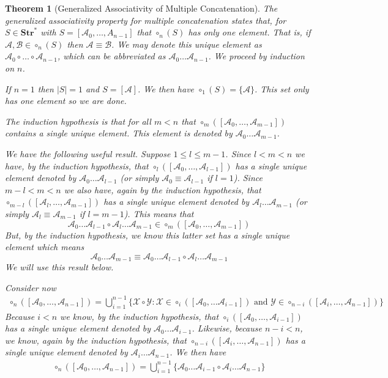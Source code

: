 \documentclass[12pt]{article}
\theoremstyle{break}
\theoremstyle{break}
\newtheorem{theorem}{Theorem}[section]
\theoremstyle{break}
\theoremstyle{break}
\newcommand{\mc}[1]{\mathcal{#1}}
\begin{document}
\begin{theorem}[Generalized Associativity of Multiple Concatenation]
The generalized associativity property for multiple concatenation states that, for $S\in\textbf{Str}^*$ with $S=[\mc{A}_0,\ldots,A_{n-1}]$ that $\circ_n(S)$ has only one element.
That is, if $\mc{A}, \mc{B}\in\circ_n(S)$ then $\mc{A}\equiv \mc{B}$.
We may denote this unique element as $\mc{A}_0\circ\ldots\circ\mc{A}_{n-1}$, which can be abbreviated as $\mc{A}_0\ldots\mc{A}_{n-1}$.
We proceed by induction on $n$.

If $n=1$ then $|S|=1$ and $S = [\mc{A}]$.
We then have $\circ_1(S) = \{\mc{A}\}$.
This set only has one element so we are done.

The induction hypothesis is that for all $m<n$ that $\circ_m([\mc{A}_0, \ldots, \mc{A}_{m-1}])$ contains a single unique element.
This element is denoted by $\mc{A}_0\ldots\mc{A}_{m-1}$.

We have the following useful result.
Suppose $1 \le l \le {m-1}$.
Since $l < m < n$ we have, by the induction hypothesis, that $\circ_l([\mc{A}_0, \ldots, \mc{A}_{l-1}])$ has a single unique element denoted by $\mc{A}_0\ldots\mc{A}_{l-1}$ (or simply $\mc{A}_0 \equiv \mc{A}_{l-1}$ if $l=1$).
Since $m-l < m < n$ we also have, again by the induction hypothesis, that $\circ_{m-l}([\mc{A}_l, \ldots, \mc{A}_{m-1}])$ has a single unique element denoted by $\mc{A}_l\ldots\mc{A}_{m-1}$ (or simply $\mc{A}_l \equiv \mc{A}_{m-1}$ if $l=m-1$).
This means that
$$
\mc{A}_0\ldots\mc{A}_{l-1} \circ \mc{A}_l\ldots\mc{A}_{m-1} \in \circ_m([\mc{A}_0, \ldots, \mc{A}_{m-1}])
$$
But, by the induction hypothesis, we know this latter set has a single unique element which means
$$
\mc{A}_0\ldots\mc{A}_{m-1} \equiv \mc{A}_0\ldots\mc{A}_{l-1}\circ \mc{A}_l \ldots \mc{A}_{m-1}
$$
We will use this result below.

Consider now
\begin{align*}
\circ_n([\mc{A}_0,\ldots, \mc{A}_{n-1}]) = \bigcup_{i=1}^{n-1} \{\mc{X}\circ\mc{Y}:\mc{X} \in \circ_i([\mc{A}_0,\ldots \mc{A}_{i-1}]) \text{ and } \mc{Y}\in \circ_{n-i}([\mc{A}_{i}, \ldots, \mc{A}_{n-1}])\}
\end{align*}
Because $i<n$ we know, by the induction hypothesis, that $\circ_i([\mc{A}_0, \ldots, \mc{A}_{i-1}])$ has a single unique element denoted by $\mc{A}_0\ldots\mc{A}_{i-1}$.
Likewise, because $n-i < n$, we know, again by the induction hypothesis, that $\circ_{n-i}([\mc{A}_i, \ldots, \mc{A}_{n-1}])$ has a single unique element denoted by $\mc{A}_i \ldots \mc{A}_{n-1}$.
We then have
\begin{align}
\circ_n([\mc{A}_0, \ldots, \mc{A}_{n-1}]) = \bigcup_{i=1}^{n-1} \{\mc{A}_0\ldots\mc{A}_{i-1}\circ\mc{A}_i\ldots\mc{A}_{n-1}\}
\end{align}


\end{theorem}
\end{document}
